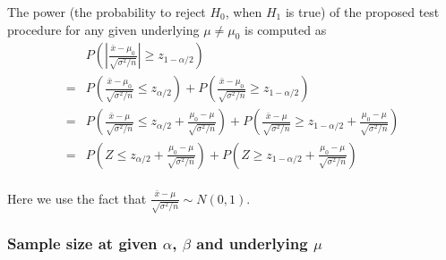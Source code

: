 \documentclass[a4paper,12pt]{article}
\begin{document}
The power (the probability to reject $H_0$, when $H_1$ is true) of the proposed test procedure for any given underlying $\mu \neq \mu_0$ is computed as
\begin{equation}
  \label{eq:power_equation_one_sample_sigma_known}
  \begin{aligned}
    & P\left(
      \left|
        \frac{\bar{x} - \mu_0}{\sqrt{\sigma^2 / n}}
      \right|
      \geq z_{1 - \alpha / 2}
    \right)    \\
    = & P\left(
      \frac{\bar{x} - \mu_0}{\sqrt{\sigma^2 / n}}
      \leq z_{\alpha / 2}
    \right)
    + P\left(
      \frac{\bar{x} - \mu_0}{\sqrt{\sigma^2 / n}}
      \geq z_{1 - \alpha / 2}
    \right)    \\
    = & P\left(
      \frac{\bar{x} - \mu}{\sqrt{\sigma^2 / n}}
      \leq z_{\alpha / 2}
      + \frac{\mu_0 - \mu}{\sqrt{\sigma^2 / n}}
    \right)
    + P\left(
      \frac{\bar{x} - \mu}{\sqrt{\sigma^2 / n}}
      \geq z_{1 - \alpha / 2}
      + \frac{\mu_0 - \mu}{\sqrt{\sigma^2 / n}}
    \right)    \\
    = & P\left(
      Z
      \leq z_{\alpha / 2}
      + \frac{\mu_0 - \mu}{\sqrt{\sigma^2 / n}}
    \right)
    + P\left(
      Z
      \geq z_{1 - \alpha / 2}
      + \frac{\mu_0 - \mu}{\sqrt{\sigma^2 / n}}
    \right)    \\
  \end{aligned}  
\end{equation}

Here we use the fact that $  \frac{\bar{x} - \mu}{\sqrt{\sigma^2 / n}} \sim N\left(0, 1\right)$. 

\subsubsection{Sample size at given $\alpha$, $\beta$ and underlying $\mu$}
\label{sec:sample-size-at}
\end{document}
